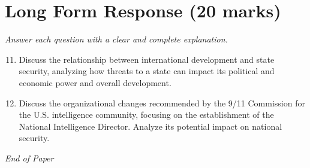 \documentclass[12pt]{article}
\begin{document}
\section*{Long Form Response (20 marks)}
\textit{Answer each question with a clear and complete explanation.}
\begin{enumerate}[label=\arabic*.]
\setcounter{enumi}{10}
\item Discuss the relationship between international development and state security, analyzing how threats to a state can impact its political and economic power and overall development.
\item Discuss the organizational changes recommended by the 9/11 Commission for the U.S. intelligence community, focusing on the establishment of the National Intelligence Director. Analyze its potential impact on national security.
\end{enumerate}

\vfill
\noindent\textit{End of Paper}
\end{document}
